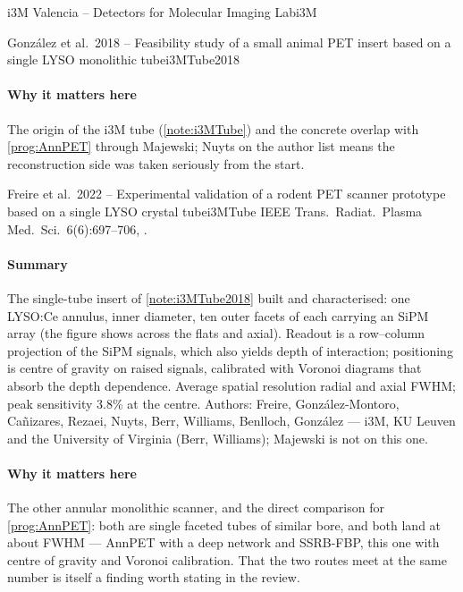 \begin{programnote}{i3M Valencia -- Detectors for Molecular Imaging Lab}{i3M}
\begin{papernote}{González et al.\ 2018 -- Feasibility study of a small animal PET insert based on a single LYSO monolithic tube}{i3MTube2018}
\paragraph{Why it matters here}
The origin of the i3M tube (\ref{note:i3MTube}) and the concrete overlap
with \ref{prog:AnnPET} through Majewski; Nuyts on the author list means the
reconstruction side was taken seriously from the start.

\end{papernote}

\begin{papernote}{Freire et al.\ 2022 -- Experimental validation of a rodent PET scanner prototype based on a single LYSO crystal tube}{i3MTube}
IEEE Trans.\ Radiat.\ Plasma Med.\ Sci.\ 6(6):697--706, .

\paragraph{Summary}
The single-tube insert of \ref{note:i3MTube2018} built and characterised:
one LYSO:Ce annulus,  inner diameter, ten outer facets of
 each carrying an SiPM array (the figure
shows  across the flats and  axial). Readout is a
row--column projection of the SiPM signals, which also yields depth of
interaction; positioning is centre of gravity on raised signals, calibrated
with Voronoi diagrams that absorb the depth dependence. Average spatial
resolution  radial and  axial FWHM; peak
sensitivity 3.8\% at the centre. Authors: Freire, González-Montoro,
Cañizares, Rezaei, Nuyts, Berr, Williams, Benlloch, González --- i3M, KU
Leuven and the University of Virginia (Berr, Williams); Majewski is not on
this one.

\paragraph{Why it matters here}
The other annular monolithic scanner, and the direct comparison for
\ref{prog:AnnPET}: both are single faceted tubes of similar bore, and both
land at about  FWHM --- AnnPET with a deep network and SSRB-FBP,
this one with centre of gravity and Voronoi calibration. That the two routes
meet at the same number is itself a finding worth stating in the review.


\end{papernote}
\end{programnote}

